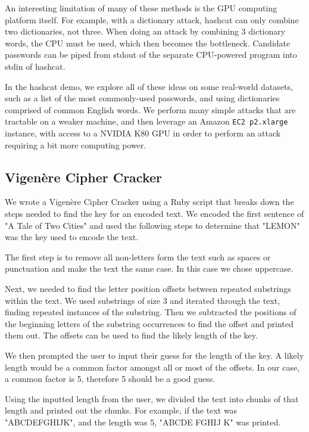\documentclass[acmlarge]{acmart}
\begin{document}
An interesting limitation of many of these methods is the GPU computing platform itself. For example, with a dictionary attack, hashcat can only combine two dictionaries, not three. When doing an attack by combining 3 dictionary words, the CPU must be used, which then becomes the bottleneck. Candidate passwords can be piped from stdout of the separate CPU-powered program into stdin of hashcat.

In the hashcat demo, we explore all of these ideas on some real-world datasets, such as a list of the most commonly-used passwords, and using dictionaries comprised of common English words. We perform many simple attacks that are tractable on a weaker machine, and then leverage an Amazon \texttt{EC2 p2.xlarge} instance, with access to a NVIDIA K80 GPU in order to perform an attack requiring a bit more computing power.

\subsection{Vigen\`{e}re Cipher Cracker}\label{sec:vinegar}

We wrote a Vigen\`{e}re Cipher Cracker using a Ruby script that breaks down the steps needed to find the key for an encoded text. We encoded the first sentence of "A Tale of Two Cities" and used the following steps to determine that "LEMON" was the key used to encode the text.

The first step is to remove all non-letters form the text such as spaces or punctuation and make the text the same case. In this case we chose uppercase.

Next, we needed to find the letter position offsets between repeated substrings within the text. We used substrings of size 3 and iterated through the text, finding repeated instances of the substring. Then we subtracted the positions of the beginning letters of the substring occurrences to find the offset and printed them out. The offsets can be used to find the likely length of the key.

We then prompted the user to input their guess for the length of the key. A likely length would be a common factor amongst all or most of the offsets. In our case, a common factor is 5, therefore 5 should be a good guess.

Using the inputted length from the user, we divided the text into chunks of that length and printed out the chunks. For example, if the text was "ABCDEFGHIJK", and the length was 5, "ABCDE FGHIJ K" was printed.
\end{document}
